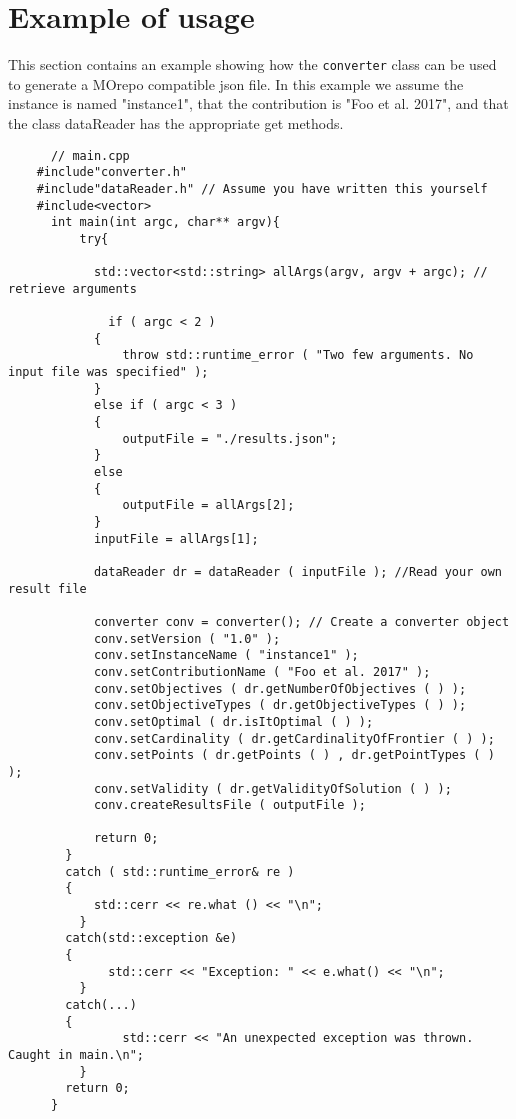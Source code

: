  
  \section{Example of usage}
  This section contains an example showing how the \texttt{converter} class can be used to generate a MOrepo compatible json file. In this example we assume the instance
  is named "instance1", that the contribution is "Foo et al. 2017", and that the class dataReader has the appropriate get methods.

  \begin{lstlisting}
      // main.cpp
    #include"converter.h"
    #include"dataReader.h" // Assume you have written this yourself
    #include<vector>
      int main(int argc, char** argv){
          try{

            std::vector<std::string> allArgs(argv, argv + argc); // retrieve arguments

              if ( argc < 2 )
            {
                throw std::runtime_error ( "Two few arguments. No input file was specified" );
            }
            else if ( argc < 3 )
            {
                outputFile = "./results.json";
            }
            else
            {
                outputFile = allArgs[2];
            }
            inputFile = allArgs[1];

            dataReader dr = dataReader ( inputFile ); //Read your own result file

            converter conv = converter(); // Create a converter object
            conv.setVersion ( "1.0" );
            conv.setInstanceName ( "instance1" );
            conv.setContributionName ( "Foo et al. 2017" );
            conv.setObjectives ( dr.getNumberOfObjectives ( ) );
            conv.setObjectiveTypes ( dr.getObjectiveTypes ( ) );
            conv.setOptimal ( dr.isItOptimal ( ) );
            conv.setCardinality ( dr.getCardinalityOfFrontier ( ) );
            conv.setPoints ( dr.getPoints ( ) , dr.getPointTypes ( ) );
            conv.setValidity ( dr.getValidityOfSolution ( ) );
            conv.createResultsFile ( outputFile );

            return 0;
        }
        catch ( std::runtime_error& re )
        {
            std::cerr << re.what () << "\n";
          }
        catch(std::exception &e)
        {
              std::cerr << "Exception: " << e.what() << "\n";
          }
        catch(...)
        {
                std::cerr << "An unexpected exception was thrown. Caught in main.\n";
          }
        return 0;
      }
  \end{lstlisting}
 